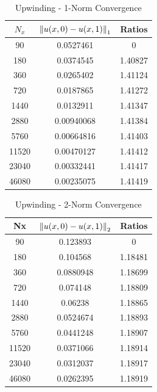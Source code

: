 \documentclass[12pt]{article}
\begin{document}
\begin{minipage}{0.5\textwidth}
\begin{table}[H]
\caption{Upwinding - 1-Norm Convergence}
\centering\begin{tabular}{||c|cc||}
\hline \hline
    $N_x$ &   $\norm{u(x,0)-u(x,1)}_1$ &   Ratios \\
\hline
    90 &     0.0527461  &  0       \\
   180 &     0.0374545  &  1.40827 \\
   360 &     0.0265402  &  1.41124 \\
   720 &     0.0187865  &  1.41272 \\
  1440 &     0.0132911  &  1.41347 \\
  2880 &     0.00940068 &  1.41384 \\
  5760 &     0.00664816 &  1.41403 \\
 11520 &     0.00470127 &  1.41412 \\
 23040 &     0.00332441 &  1.41417 \\
 46080 &     0.00235075 &  1.41419 \\
\hline \hline
\end{tabular}
\end{table}
\end{minipage}%
\begin{minipage}{0.5\textwidth}
\begin{table}[H]
\caption{Upwinding - 2-Norm Convergence}
\centering\begin{tabular}{||c|cc||}
\hline \hline
    Nx &   $\norm{u(x,0)-u(x,1)}_2$ &   Ratios \\
\hline
    90 &      0.123893  &  0       \\
   180 &      0.104568  &  1.18481 \\
   360 &      0.0880948 &  1.18699 \\
   720 &      0.074148  &  1.18809 \\
  1440 &      0.06238   &  1.18865 \\
  2880 &      0.0524674 &  1.18893 \\
  5760 &      0.0441248 &  1.18907 \\
 11520 &      0.0371066 &  1.18914 \\
 23040 &      0.0312037 &  1.18917 \\
 46080 &      0.0262395 &  1.18919 \\
\hline \hline
\end{tabular}
\end{table}
\end{minipage}
\end{document}
